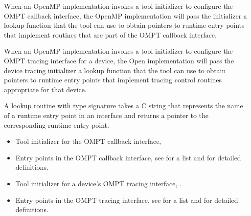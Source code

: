 \begin{comment}
When an OpenMP runtime implementation is initialized for a device,
if a tool callback to initialize tracing for devices has been provided
to the OpenMP implementation by \code{ompt\_tool}, 
it will be invoked on the host. The OpenMP implementation will pass the
tool's device tracing initializer callback a lookup routine that the tool
can use to obtain pointers to runtime entry points that implement
tracing control routines appropriate for that device. 

If a tool callback to initialize monitoring using the OMPT callback
interface has been provided to the OpenMP implementation by
\code{ompt\_tool} and it is invoked on a device,
the initializer will be passed a lookup function that it can use   
to obtain pointers to runtime entry points.
\end{comment}

When an OpenMP implementation invokes a tool initializer to configure
the OMPT callback interface, the OpenMP implementation will pass the
initializer a lookup function that the tool can use to obtain 
pointers to runtime entry points that implement routines that are part of 
the OMPT callback interface.

When an OpenMP implementation invokes a tool initializer to configure
the OMPT tracing interface for a device, the Open implementation will
pass the device tracing initializer a lookup function that the tool
can use to obtain pointers to runtime entry points that implement
tracing control routines appropriate for that device. 

\constraints
A lookup routine with type
signature  takes a C string
that represents the name of a runtime entry point in an interface
and returns a pointer to the corresponding runtime entry point.

\crossreferences
\begin{itemize}
\item Tool initializer for the OMPT callback interface, 
\item Entry points in the OMPT callback interface, see
   for a list and
   for detailed definitions.
\item Tool initializer for a device's OMPT tracing interface, .
\item Entry points in the OMPT tracing interface, see
   for a list and
   for detailed definitions.
\end{itemize}
